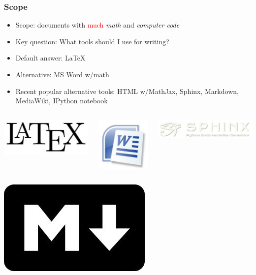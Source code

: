 \documentclass{beamer}
\begin{document}
\begin{frame}
\frametitle{Scope}

\begin{itemize}
\pause
  \item Scope: documents with \textcolor{red}{much} \emph{math} and \emph{computer code}
\pause
  \item Key question: What tools should I use for writing?
\pause
  \item Default answer: {\LaTeX}
\pause
  \item Alternative: MS Word w/math
\pause
  \item Recent popular alternative tools: HTML w/MathJax, Sphinx, Markdown, MediaWiki, IPython notebook
\end{itemize}
\noindent
\begin{columns}
\vspace{6mm}
\centerline{\includegraphics[width=0.3\linewidth]{testfigs/LaTeX_logo.jpg}}
\vspace{6mm}

\vspace{6mm}
\centerline{\includegraphics[width=0.2\linewidth]{testfigs/MS_Word_logo.jpg}}
\vspace{6mm}

\vspace{6mm}
\centerline{\includegraphics[width=0.4\linewidth]{testfigs/sphinx_logo.png}}
\vspace{6mm}

\end{columns}
\begin{columns}
\vspace{6mm}
\centerline{\includegraphics[width=0.2\linewidth]{testfigs/markdown_logo.jpg}}
\vspace{6mm}


\end{columns}
\end{frame}
\end{document}
